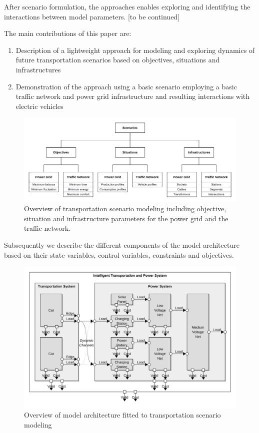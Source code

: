 After scenario formulation, the approaches enables exploring and identifying the interactions between model parameters. [to be continued]

The main contributions of this paper are:

\begin{enumerate}
	\item Description of a lightweight approach for modeling and exploring dynamics of future
	transportation scenarios based on objectives, situations and infrastructures
	\item Demonstration of the approach using a basic scenario employing a basic traffic network and power grid infrastructure
	and resulting interactions with electric vehicles
\end{enumerate}

\begin{figure}[t!]
	\centering
	\includegraphics[width=1\columnwidth]{../gfx/approach.png}
	\caption{Overview of transportation scenario modeling including objective, situation and infrastructure parameters for the power grid and the traffic network.}
	\label{fig:approach}
\end{figure}

Subsequently we describe the different components of the model architecture based on their state variables, control variables, constraints and objectives. 

\begin{figure}[t!]
	\centering
	\includegraphics[width=0.925\columnwidth]{../gfx/model.png}
	\caption{Overview of model architecture fitted to transportation scenario modeling}
	\label{fig:model}
\end{figure}

